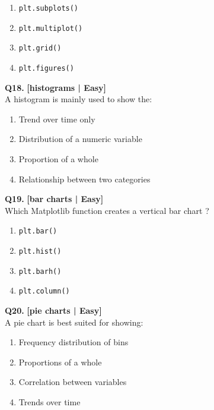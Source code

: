 \begin{enumerate}[label=(\alph*),topsep=2pt,itemsep=1pt,partopsep=0pt,parsep=0pt]
    \item \relax \texttt{plt.subplots()}
    \item \relax \texttt{plt.multiplot()}
    \item \relax \texttt{plt.grid()}
    \item \relax \texttt{plt.figures()}
\end{enumerate}
\vspace{2mm}

\noindent\textbf{Q18.} \hfill {\small\color{LPUOrange}\textbf{[histograms | Easy]}}\\[2pt]
A histogram is mainly used to show the:

\begin{enumerate}[label=(\alph*),topsep=2pt,itemsep=1pt,partopsep=0pt,parsep=0pt]
    \item \relax Trend over time only
    \item \relax Distribution of a numeric variable
    \item \relax Proportion of a whole
    \item \relax Relationship between two categories
\end{enumerate}
\vspace{2mm}

\noindent\textbf{Q19.} \hfill {\small\color{LPUOrange}\textbf{[bar charts | Easy]}}\\[2pt]
Which Matplotlib function creates a vertical bar chart ?

\begin{enumerate}[label=(\alph*),topsep=2pt,itemsep=1pt,partopsep=0pt,parsep=0pt]
    \item \relax \texttt{plt.bar()}
    \item \relax \texttt{plt.hist()}
    \item \relax \texttt{plt.barh()}
    \item \relax \texttt{plt.column()}
\end{enumerate}
\vspace{2mm}

\noindent\textbf{Q20.} \hfill {\small\color{LPUOrange}\textbf{[pie charts | Easy]}}\\[2pt]
A pie chart is best suited for showing:

\begin{enumerate}[label=(\alph*),topsep=2pt,itemsep=1pt,partopsep=0pt,parsep=0pt]
    \item \relax Frequency distribution of bins
    \item \relax Proportions of a whole
    \item \relax Correlation between variables
    \item \relax Trends over time
\end{enumerate}
\vspace{2mm}


